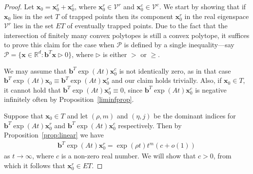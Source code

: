 \begin{proof}

  Let
  $\boldsymbol{x}_{0}=\boldsymbol{x}_{0}^{r}+\boldsymbol{x}_{0}^{c}$,
  where $\boldsymbol{x}_{0}^{r}\in \mathcal{V}^{r}$ and
  $\boldsymbol{x}_{0}^{c}\in \mathcal{V}^{c}$. We start by showing
  that if $\boldsymbol{x}_{0}$ lies in the set $T$ of trapped points
  then its component $\boldsymbol{x}_{0}^{r}$ in the real eigenspace
  $\mathcal{V}^{r}$ lies in the set $\mathit{ET}$ of eventually
  trapped points.
Due to the
fact that the intersection of finitely many convex polytopes is still
a convex polytope, it suffices to prove this claim for the case when
  $\mathcal{P}$ is defined by a single inequality---say
  $\mathcal{P}=\lbrace \boldsymbol{x}\in\mathbb{R}^{d}:
  \boldsymbol{b}^{T}\boldsymbol{x}\triangleright 0\rbrace$, where
  $\triangleright$ is either $>$ or $\geq$.

  We may assume that
  $\boldsymbol{b}^{T} \exp(At) \boldsymbol{x}_{0}^{c}$ is not identically
  zero, as in that case
  $\boldsymbol{b}^{T} \exp(At)\boldsymbol{x}_{0} \equiv
  \boldsymbol{b}^{T} \exp(At)\boldsymbol{x}_{0}^{r}$ and our claim
  holds trivially.
  Also, if $\boldsymbol{x}_{0}\in\mathit{T}$, it cannot hold that
  $\boldsymbol{b}^{T} \exp(At) \boldsymbol{x}_{0}^{r} \equiv 0$, since
  $\boldsymbol{b}^{T} \exp(At) \boldsymbol{x}_{0}^{c}$ is negative
  infinitely often by Proposition~\ref{liminfprop}.

  Suppose that $\boldsymbol{x}_{0}\in\mathit{T}$ and let $(\rho,m)$
  and $(\eta,j)$ be the dominant indices for
  $\boldsymbol{b}^{T} \exp(At) \boldsymbol{x}_{0}^{r}$ and
  $\boldsymbol{b}^{T} \exp(At) \boldsymbol{x}_{0}^{c}$ respectively.
Then by Proposition~\ref{prop:linear} we have
\begin{gather}
\boldsymbol{b}^{T} \exp(At) \boldsymbol{x}_{0}^{r} = \exp(\rho t)t^m (c
  + o(1))
\label{eq:real}
\end{gather}
 as $t \rightarrow \infty$, where $c$ is a non-zero real
number.  We will show that $c>0$, from which it follows  that
$\boldsymbol{x}_{0}^{r} \in \mathit{ET}$.


\end{proof}
